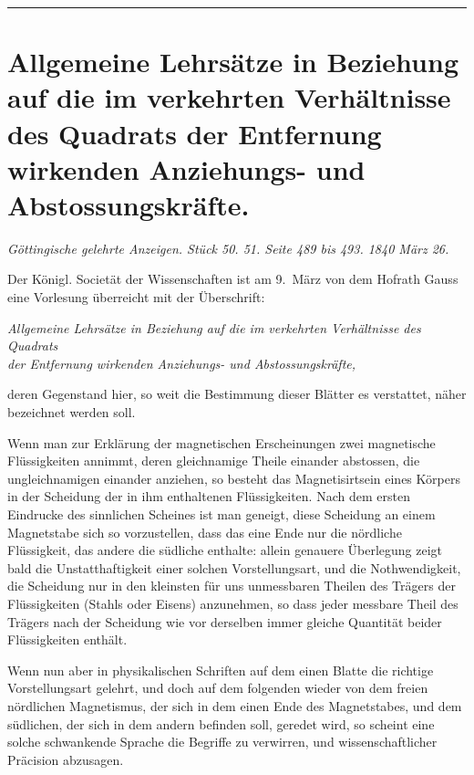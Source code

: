 \documentclass[12pt,a4paper]{article}
\begin{document}
\vspace{2em}
\begin{center}
    \rule{0.5\textwidth}{0.4pt}
\end{center}
\vspace{1em}

\section*{Allgemeine Lehrsätze in Beziehung auf die im verkehrten Verhältnisse des Quadrats der Entfernung wirkenden Anziehungs- und Abstossungskräfte.}

\textit{Göttingische gelehrte Anzeigen. Stück 50. 51. Seite 489 bis 493. 1840 März 26.}

\bigskip

Der Königl. Societät der Wissenschaften ist am 9.~März von dem Hofrath Gauss eine Vorlesung überreicht mit der Überschrift:

\begin{center}
    \textit{Allgemeine Lehrsätze in Beziehung auf die im verkehrten Verhältnisse des Quadrats\\der Entfernung wirkenden Anziehungs- und Abstossungskräfte,}
\end{center}

deren Gegenstand hier, so weit die Bestimmung dieser Blätter es verstattet, näher bezeichnet werden soll.

Wenn man zur Erklärung der magnetischen Erscheinungen zwei magnetische Flüssigkeiten annimmt, deren gleichnamige Theile einander abstossen, die ungleichnamigen einander anziehen, so besteht das Magnetisirtsein eines Körpers in der Scheidung der in ihm enthaltenen Flüssigkeiten. Nach dem ersten Eindrucke des sinnlichen Scheines ist man geneigt, diese Scheidung an einem Magnetstabe sich so vorzustellen, dass das eine Ende nur die nördliche Flüssigkeit, das andere die südliche enthalte: allein genauere Überlegung zeigt bald die Unstatthaftigkeit einer solchen Vorstellungsart, und die Nothwendigkeit, die Scheidung nur in den kleinsten für uns unmessbaren Theilen des Trägers der Flüssigkeiten (Stahls oder Eisens) anzunehmen, so dass jeder messbare Theil des Trägers nach der Scheidung wie vor derselben immer gleiche Quantität beider Flüssigkeiten enthält.

Wenn nun aber in physikalischen Schriften auf dem einen Blatte die richtige Vorstellungsart gelehrt, und doch auf dem folgenden wieder von dem freien nördlichen Magnetismus, der sich in dem einen Ende des Magnetstabes, und dem südlichen, der sich in dem andern befinden soll, geredet wird, so scheint eine solche schwankende Sprache die Begriffe zu verwirren, und wissenschaftlicher Präcision abzusagen.
\end{document}
